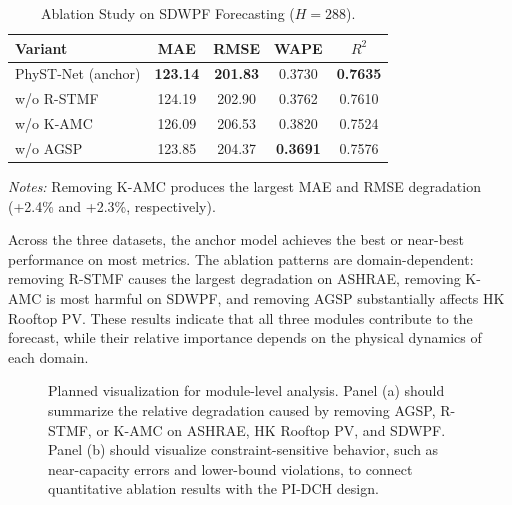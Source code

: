 \begin{table}[!t]
\caption{Ablation Study on SDWPF Forecasting ($H=288$).}
\label{tab:ablation_sdwpf}
\centering
\scriptsize

\renewcommand{\arraystretch}{1.08}
\setlength{\tabcolsep}{0pt}
\begin{tabular*}{\linewidth}{@{\extracolsep{\fill}}lcccc}
\toprule
\textbf{Variant} & \textbf{MAE} & \textbf{RMSE} & \textbf{WAPE} & \textbf{$R^2$} \\
\midrule
PhyST-Net (anchor) & \textbf{123.14} & \textbf{201.83} & 0.3730 & \textbf{0.7635} \\
w/o R-STMF & 124.19 & 202.90 & 0.3762 & 0.7610 \\
w/o K-AMC & 126.09 & 206.53 & 0.3820 & 0.7524 \\
w/o AGSP & 123.85 & 204.37 & \textbf{0.3691} & 0.7576 \\
\bottomrule
\end{tabular*}
\par\vspace{0.65\baselineskip}
\begin{minipage}{\linewidth}
\raggedright\scriptsize
\textit{Notes:} Removing K-AMC produces the largest MAE and RMSE degradation (+2.4\% and +2.3\%, respectively).
\end{minipage}
\end{table}

Across the three datasets, the anchor model achieves the best or near-best performance on most metrics. The ablation patterns are domain-dependent: removing R-STMF causes the largest degradation on ASHRAE, removing K-AMC is most harmful on SDWPF, and removing AGSP substantially affects HK Rooftop PV. These results indicate that all three modules contribute to the forecast, while their relative importance depends on the physical dynamics of each domain.

\begin{figure}[!t]
\centering
{} \hfil
{}
\caption{Planned visualization for module-level analysis. Panel (a) should summarize the relative degradation caused by removing AGSP, R-STMF, or K-AMC on ASHRAE, HK Rooftop PV, and SDWPF. Panel (b) should visualize constraint-sensitive behavior, such as near-capacity errors and lower-bound violations, to connect quantitative ablation results with the PI-DCH design.}
\label{fig:ablation_result_visual}
\end{figure}

